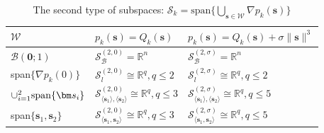 \documentclass[colorlinks=true, linkcolor=blue, citecolor=blue, urlcolor=blue]{article}
\theoremstyle{plain}
\theoremstyle{definition}
\theoremstyle{remark}
\begin{document}
\begin{table}[htbp]
    \centering
    \caption{The second type of subspaces: $\mathcal{S}_k=\text{span}\{\bigcup_{\bm{s}\in\mathcal{W}}\nabla p_k(\bm{s})\}$}
    \centering
    \begin{tabular}{m{3cm}<{\centering}m{4cm}<{\centering}m{4cm}<{\centering}}
    \toprule
     $\mathcal{W}$ & $p_k(\bm{s})=Q_k(\bm{s})$  & $p_k(\bm{s})=Q_k(\bm{s})+\sigma \|\bm{s}\|^3$\\
    \midrule
        $\mathcal{B}(\bm 0;1)$  & $\mathcal{S}_{\mathcal{B}}^{(2,0)}=\mathbb{R}^n$ & $\mathcal{S}_{\mathcal{B}}^{(2,\sigma)}=\mathbb{R}^n$  \\
        span$\{\nabla p_k(0)\}$ & $\mathcal{S}_{l}^{(2,0)}\cong\mathbb{R}^q,q\leq 2$ & 
$\mathcal{S}_{l}^{(2,\sigma)}\cong\mathbb{R}^q,q\leq 2$\\
        $\cup_{i=1}^2{\rm span}\{\bm s_i\}$ & 
        $\mathcal{S}_{\langle\bm s_1\rangle,\langle\bm s_2\rangle}^{(2,0)}\cong\mathbb{R}^q,q\leq 3$
        &
        $\mathcal{S}_{\langle\bm s_1\rangle,\langle\bm s_2\rangle}^{(2,\sigma)}\cong\mathbb{R}^q,q\leq5$
        \\
        span$\{\bm s_1,\bm s_2\}$ & $\mathcal{S}_{\langle\bm s_1,\bm s_2\rangle}^{(2,0)}\cong\mathbb{R}^q,q\leq3$ & $\mathcal{S}_{\langle\bm s_1,\bm s_2\rangle}^{(2,\sigma)}\cong\mathbb{R}^q,q\leq5$\\
     \bottomrule   
    \end{tabular}   
    \label{tab:subspace-2}
\end{table}
\end{document}
